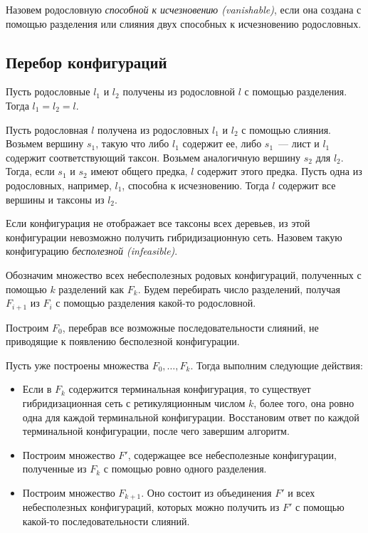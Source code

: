 \documentclass[14pt]{matmex-diploma-custom}
\begin{document}
        Назовем родословную \textit{способной к исчезновению (vanishable)}, если она создана с помощью разделения или слияния двух способных к исчезновению родословных.
        
        \subsection{Перебор конфигураций}
            Пусть родословные $l_1$ и $l_2$ получены из родословной $l$ с помощью разделения. Тогда $l_1=l_2=l$.
            
            Пусть родословная $l$ получена из родословных $l_1$ и $l_2$ с помощью слияния. Возьмем вершину $s_1$, такую что либо $l_1$ содержит ее, либо $s_1$~--- лист и $l_1$ содержит соответствующий таксон. Возьмем аналогичную вершину $s_2$ для $l_2$. Тогда, если $s_1$ и $s_2$ имеют общего предка, $l$ содержит этого предка. Пусть одна из родословных, например, $l_1$, способна к исчезновению. Тогда $l$ содержит все вершины и таксоны из $l_2$.
            
         Если конфигурация не отображает все таксоны всех деревьев, из этой конфигурации невозможно получить гибридизационную сеть. Назовем такую конфигурацию \textit{бесполезной (infeasible)}.
            
            Обозначим множество всех небесполезных родовых конфигураций, полученных с помощью $k$ разделений как $F_k$. Будем перебирать число разделений, получая $F_{i+1}$ из $F_i$ с помощью разделения какой-то родословной.
            
            Построим $F_0$, перебрав все возможные последовательности слияний, не приводящие к появлению бесполезной конфигурации.
            
            Пусть уже построены множества $F_0, \ldots, F_k$. Тогда выполним следующие действия:
            \begin{itemize}
                \item Если в $F_k$ содержится терминальная конфигурация, то существует гибридизационная сеть с ретикуляционным числом $k$, более того, она ровно одна для каждой терминальной конфигурации. Восстановим ответ по каждой терминальной конфигурации, после чего завершим алгоритм.
                \item Построим множество $F'$, содержащее все небесполезные конфигурации, полученные из $F_k$ с помощью ровно одного разделения.
                \item Построим множество $F_{k + 1}$. Оно состоит из объединения $F'$ и всех небесполезных конфигураций, которых можно получить из $F'$ с помощью какой-то последовательности слияний.
            \end{itemize}
            
\end{document}
